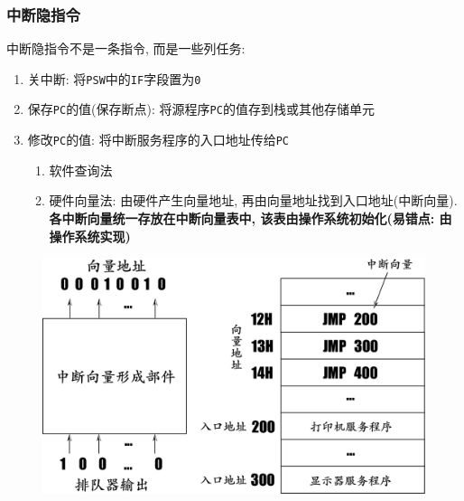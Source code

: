 \subsubsection{中断隐指令}
中断隐指令不是一条指令, 而是一些列任务:
\begin{enumerate}
\item 关中断: 将\verb|PSW|中的\verb|IF|字段置为\verb|0|
\item 保存\verb|PC|的值(保存断点): 将源程序\verb|PC|的值存到栈或其他存储单元
\item 修改\verb|PC|的值: 将{\heiti 中断服务程序}的入口地址传给\verb|PC|
\begin{enumerate}
\item 软件查询法
\item 硬件向量法: 由{\heiti 硬件}产生{\heiti 向量地址}, 再由{\heiti 向量地址}找到{\heiti 入口地址(中断向量)}. \textbf{各中断向量统一存放在中断向量表中, 该表由操作系统初始化(易错点: 由操作系统实现)}
\end{enumerate}
\end{enumerate}
\begin{figure}[H]
\centering
\includegraphics[scale=.4]{img/figure56}
\end{figure}
